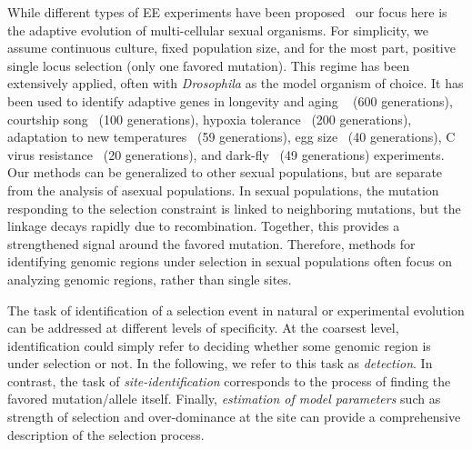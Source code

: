 \documentclass[11pt]{article}
\begin{document}
While different types of EE experiments have been
proposed~\cite{Barrick2013Genome,schlotterer2015combining} our focus
here is the adaptive evolution of multi-cellular sexual organisms. For
simplicity, we assume continuous culture, fixed population size, and
for the most part, positive single locus selection (only one favored
mutation). This regime has been extensively applied, often with
\emph{Drosophila} as the model organism of choice. It has been used to
identify adaptive genes in longevity and aging
~\cite{burke2010genome,remolina2012genomic} (600 generations),
courtship song~\cite{turner2011population} (100 generations), hypoxia
tolerance~\cite{zhou2011experimental} (200 generations), adaptation to
new temperatures~\cite{orozco2012adaptation,tobler2014massive} (59
generations), egg size~\cite{jha2015whole} (40 generations), C virus
resistance~\cite{martins2014host} (20 generations), and
dark-fly~\cite{izutsu2015dynamics} (49 generations) experiments. Our
methods can be generalized to other sexual populations, but are
separate from the analysis of asexual populations. In sexual
populations, the mutation responding to the selection constraint is
linked to neighboring mutations, but the linkage decays rapidly due to
recombination. Together, this provides a strengthened signal around
the favored mutation. Therefore, methods for identifying genomic
regions under selection in sexual populations often focus on analyzing
genomic regions, rather than single sites.

The task of identification of a selection event in natural or
experimental evolution can be addressed at different levels of
specificity. At the coarsest level, identification could simply refer
to deciding whether some genomic region is under selection or not.  In
the following, we refer to this task as \emph{detection}. In contrast,
the task of \emph{site-identification} corresponds to the process of
finding the favored mutation/allele itself. Finally, \emph{estimation
  of model parameters} such as strength of selection and over-dominance
at the site can provide a comprehensive description of the selection
process.
\end{document}
